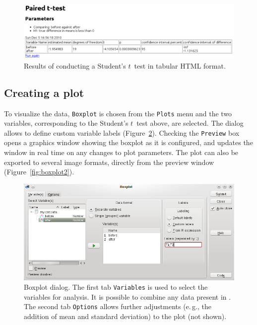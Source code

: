 \begin{figure}[t!]
 \centering
 \includegraphics[width=15.4cm]{./figures/t-test_results.png}
 \caption{Results of conducting a Student's $t$~test in tabular HTML format.}
 \label{fig:t_test_results}
\end{figure}

\subsection{Creating a plot}
\label{sec:create_plot}
To visualize the data, \texttt{Boxplot} is chosen from the \texttt{Plots} menu
and the two variables, corresponding to the Student's $t$~test above, are selected.
The dialog allows to define custom variable labels (Figure~\ref{fig:boxplot1}).
Checking the \texttt{Preview} box opens a graphics window showing the boxplot as
it is configured, and updates the window in real time on any changes to plot parameters.
The plot can also be exported to several image formats, directly from the preview window (Figure~\ref{fig:boxplot2}).

\begin{figure}[b!]
 \centering
 \includegraphics[width=15.4cm]{./figures/boxplot1.png}
 \caption{Boxplot dialog. The first tab \texttt{Variables} is used to select the variables for analysis. It is possible to
  combine any data present in . The second tab \texttt{Options} allows further adjustments (e.\,g., the addition of mean and standard deviation) to the plot (not shown).}
 \label{fig:boxplot1}
\end{figure}

